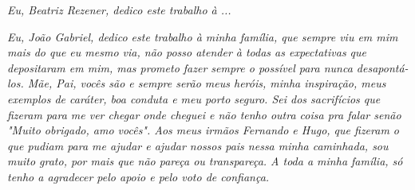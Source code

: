 \begin{dedicatoria}
   \vspace*{\fill}
   \centering
   \noindent
    \textit{
    	Eu, Beatriz Rezener, dedico este trabalho à ...}
    
   \textit{
   	Eu, João Gabriel, dedico este trabalho à minha família, que sempre viu em mim mais do que eu mesmo via, não posso atender à todas as expectativas que depositaram em mim, mas prometo fazer sempre o possível para nunca 
       desapontá-los. Mãe, Pai, vocês são e sempre serão meus heróis, minha inspiração, meus exemplos de caráter, boa conduta e meu porto seguro. Sei dos sacrifícios que fizeram para me ver chegar onde cheguei e não tenho 
       outra coisa pra falar senão "Muito obrigado, amo vocês". Aos meus irmãos Fernando e Hugo, que fizeram o que pudiam para me ajudar e ajudar nossos pais nessa minha caminhada, sou muito grato, por mais que não 
       pareça ou transpareça. A toda a minha família, só tenho a agradecer pelo apoio e pelo voto de confiança.} \vspace*{\fill}
\end{dedicatoria}
